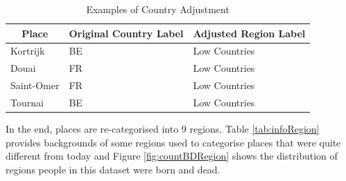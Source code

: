 \documentclass[12pt,a4paper,oneside]{book}
\begin{document}
\begin{sloppypar}
\begin{table}[H]
\centering
\caption{Examples of Country Adjustment}
\label{tab:conAdjust}
\begin{tabular}{lll}
\multicolumn{1}{c}{\textbf{Place}} & \multicolumn{1}{c}{\textbf{Original Country Label}} & \multicolumn{1}{c}{\textbf{Adjusted Region Label}} \\ \hline
Kortrijk                           & BE                                                  & Low Countries                                      \\
Douai                              & FR                                                  & Low Countries                                      \\
Saint-Omer                         & FR                                                  & Low Countries                                      \\
Tournai                            & BE                                                  & Low Countries                                     
\end{tabular}
\end{table}

In the end, places are re-categorised into 9 regions. Table \ref{tab:infoRegion} provides backgrounds of some regions used to categorise places that were quite different from today and Figure \ref{fig:countBDRegion} shows the distribution of regions people in this dataset were born and dead.


\end{sloppypar}
\end{document}
